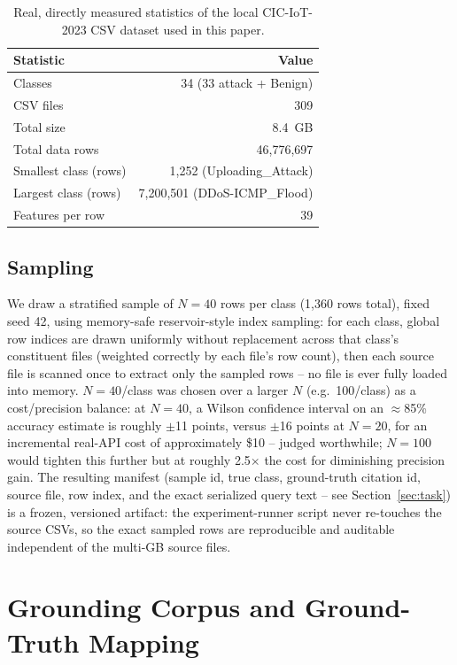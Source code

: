 \documentclass[11pt]{article}
\begin{document}
\begin{table}[h]
\centering
\small
\begin{tabular}{lr}
\toprule
\textbf{Statistic} & \textbf{Value} \\
\midrule
Classes & 34 (33 attack + Benign) \\
CSV files & 309 \\
Total size & 8.4~GB \\
Total data rows & 46{,}776{,}697 \\
Smallest class (rows) & 1{,}252 (Uploading\_Attack) \\
Largest class (rows) & 7{,}200{,}501 (DDoS-ICMP\_Flood) \\
Features per row & 39 \\
\bottomrule
\end{tabular}
\caption{Real, directly measured statistics of the local CIC-IoT-2023 CSV
dataset used in this paper.}
\label{tab:classcounts}
\end{table}

\subsection{Sampling}

We draw a stratified sample of $N{=}40$ rows per class (1{,}360 rows total),
fixed seed 42, using memory-safe reservoir-style index sampling: for each
class, global row indices are drawn uniformly without replacement across
that class's constituent files (weighted correctly by each file's row
count), then each source file is scanned once to extract only the sampled
rows -- no file is ever fully loaded into memory. $N{=}40$/class was chosen
over a larger $N$ (e.g.\ 100/class) as a cost/precision balance: at
$N{=}40$, a Wilson confidence interval on an $\approx$85\% accuracy
estimate is roughly $\pm$11 points, versus $\pm$16 points at $N{=}20$, for
an incremental real-API cost of approximately \$10 -- judged worthwhile;
$N{=}100$ would tighten this further but at roughly 2.5$\times$ the cost for
diminishing precision gain. The resulting manifest (sample id, true class,
ground-truth citation id, source file, row index, and the exact serialized
query text -- see Section~\ref{sec:task}) is a frozen, versioned artifact:
the experiment-runner script never re-touches the source CSVs, so the exact
sampled rows are reproducible and auditable independent of the multi-GB
source files.

\section{Grounding Corpus and Ground-Truth Mapping}
\label{sec:corpus}
\end{document}
